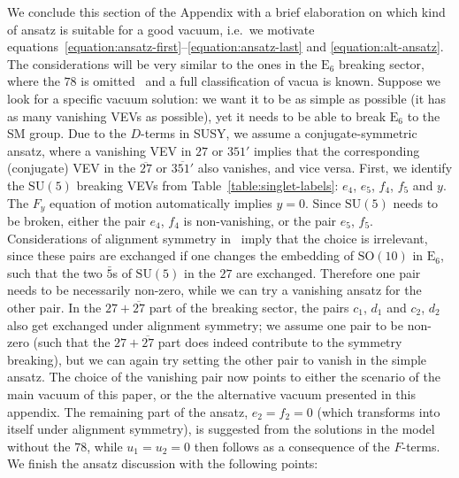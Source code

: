 \documentclass[a4paper,12pt]{article}
\def\SU{\mathrm{SU}}
\def\SO{\mathrm{SO}}
\def\EE{\mathrm{E}_6}
\begin{document}
We conclude this section of the Appendix with a brief elaboration on which kind of ansatz is suitable for a good vacuum, i.e.~we motivate equations~\eqref{equation:ansatz-first}--\eqref{equation:ansatz-last} and \eqref{equation:alt-ansatz}. The considerations will be very similar to the ones in the $\EE$ breaking sector, where the $78$ is omitted~\cite{Bajc:2013qra} and a full classification of vacua is known.
Suppose we look for a specific vacuum solution: we want it to be as simple as possible (it has as many vanishing VEVs as possible), yet it needs to be able to break $\EE$ to the SM group. Due to the $D$-terms in SUSY, we assume a conjugate-symmetric ansatz, where a vanishing VEV in $27$ or $351'$ implies that the corresponding (conjugate) VEV in the $\overline{27}$ or $\overline{351'}$ also vanishes, and vice versa. First, we identify the $\SU(5)$ breaking VEVs from Table~\ref{table:singlet-labels}: $e_4$, $e_5$, $f_4$, $f_5$ and $y$. The $F_y$ equation of motion automatically implies $y=0$. Since $\SU(5)$ needs to be broken, either the pair $e_4$, $f_4$ is non-vanishing, or the pair $e_5$, $f_5$. Considerations of alignment symmetry in~\cite{Bajc:2013qra} imply that the choice is irrelevant, since these pairs are exchanged if one changes the embedding of $\SO(10)$ in $\mathrm{E}_6$, such that the two $\bar{5}$s of $\SU(5)$ in the $27$ are exchanged. Therefore one pair needs to be necessarily non-zero, while we can try a vanishing ansatz for the other pair. In the $27+\overline{27}$ part of the breaking sector, the pairs $c_1$, $d_1$ and $c_2$, $d_2$ also get exchanged under alignment symmetry; we assume one pair to be non-zero (such that the $27+\overline{27}$ part does indeed contribute to the symmetry breaking), but we can again try setting the other pair to vanish in the simple ansatz. The choice of the vanishing pair now points to either the scenario of the main vacuum of this paper, or the the alternative vacuum presented in this appendix. The remaining part of the ansatz, $e_2=f_2=0$ (which transforms into itself under alignment symmetry), is suggested from the solutions in the model without the $78$, while $u_1=u_2=0$ then follows as a consequence of the $F$-terms. We finish the ansatz discussion with the following points:
\end{document}
